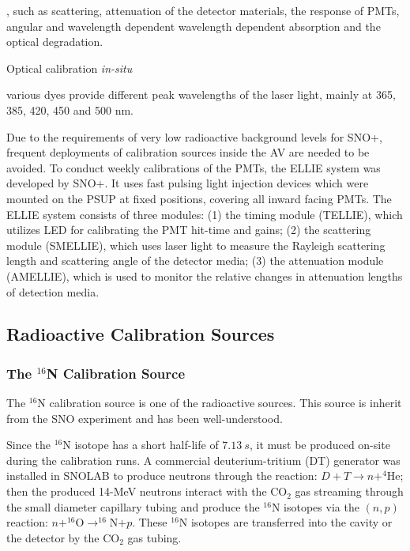 , such as scattering, attenuation of the detector materials, the response of PMTs, angular and wavelength dependent wavelength dependent absorption and the optical degradation.

Optical calibration \emph{in-situ}

various dyes provide different peak wavelengths of the laser light, mainly at 365, 385, 420, 450 and 500 nm.

Due to the requirements of very low radioactive background levels for SNO+, frequent deployments of calibration sources inside the AV are needed to be avoided. To conduct weekly calibrations of the PMTs, the ELLIE system was developed by SNO+. It uses fast pulsing light injection devices which were mounted on the PSUP at fixed positions, covering all inward facing PMTs. The ELLIE system consists of three modules: (1) the timing module (TELLIE), which utilizes LED for calibrating the PMT hit-time and gains; (2) the scattering module (SMELLIE), which uses laser light to measure the Rayleigh scattering length and scattering angle of the detector media; (3) the attenuation module (AMELLIE), which is used to monitor the relative changes in attenuation lengths of detection media\cite{snop_jinst,jones2011background,walker2016study,dunger2018topological}.

\subsection{Radioactive Calibration Sources}
\subsubsection{The $^{16}$N Calibration Source}\label{n16_description}
The $^{16}$N calibration source is one of the radioactive sources. This source is inherit from the SNO experiment and has been well-understood\cite{dragowsky1999sudbury,dragowsky200216n,hamer2001energy}.   

Since the $^{16}$N isotope has a short half-life of $7.13~s$, it must be produced on-site during the calibration runs. A commercial deuterium-tritium (DT) generator was installed in SNOLAB to produce neutrons through the reaction: $D+T\to n+^{4}$He; then the produced 14-MeV neutrons interact with the CO$_2$ gas streaming through the small diameter capillary tubing and produce the $^{16}$N isotopes via the $(n,p)$ reaction: $n+^{16}$O$\to^{16}$N$+p$. These $^{16}$N isotopes are transferred into the cavity or the detector by the CO$_2$ gas tubing\cite{dragowsky200216n}.  

